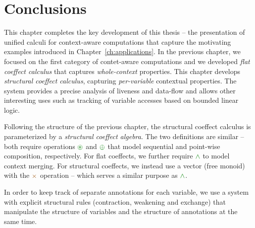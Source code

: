                                                                           
%
%
                                                                          

\section{Conclusions}

This chapter completes the key development of this thesis -- the presentation of unified calculi
for context-aware computations that capture the motivating examples introduced in 
Chapter~\ref{ch:applications}. In the previous chapter, we focused on the first category of 
contet-aware computations and we developed \emph{flat coeffect calculus} that captures
\emph{whole-context} properties. This chapter develops \emph{structural coeffect calculus},
capturing \emph{per-variable} contextual properties. The system provides a precise 
analysis of liveness and data-flow and allows other interesting uses such as tracking of variable
accesses based on bounded linear logic.

Following the structure of the previous chapter, the structural coeffect calculus is parameterized
by a \emph{structural coeffect algebra}. The two definitions are similar -- both require operations 
$\cseq$ and $\cpar$ that model sequential and point-wise composition, respectively. For flat 
coeffects, we further require $\czip$ to model context merging. For structural coeffects, we 
instead use a vector (free monoid) with the $\atimes$ operation -- which serves a similar purpose
as $\czip$.

In order to keep track of separate annotations for each variable, we use a system with 
explicit structural rules (contraction, weakening and exchange) that manipulate the structure
of variables and the structure of annotations at the same time.

